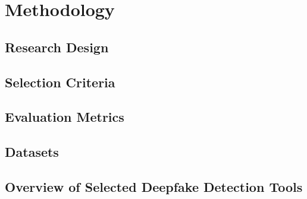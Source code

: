 
\chapter{Methodology}\label{chapter:methodology}

\section{Research Design}
\section{Selection Criteria}
\section{Evaluation Metrics}
\section{Datasets}
\section{Overview of Selected Deepfake Detection Tools}